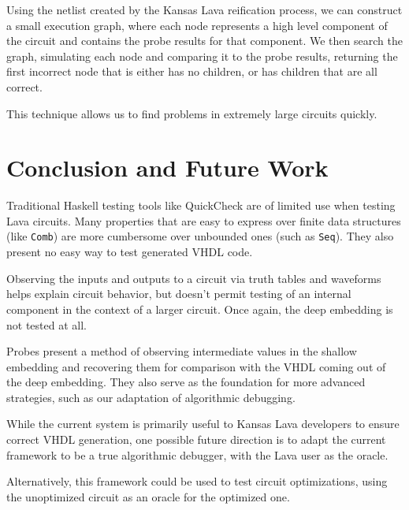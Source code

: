 \documentclass{llncs}
\begin{document}

Using the netlist created by the Kansas Lava reification process, we can construct
a small execution graph, where each node represents a high level component of
the circuit and contains the probe results for that component. We then search the
graph, simulating each node and comparing it to the probe results, returning
the first incorrect node that is either has no children, or has children that
are all correct.


This technique allows us to find problems in extremely large circuits quickly.


\section{Conclusion and Future Work}

Traditional Haskell testing tools like QuickCheck are of limited use
when testing Lava circuits. Many properties that are easy to express
over finite data structures (like \verb!Comb!) are more cumbersome
over unbounded ones (such as \verb!Seq!). They also present no easy
way to test generated VHDL code.

Observing the inputs and outputs to a circuit via truth tables and
waveforms helps explain circuit behavior, but doesn't permit testing
of an internal component in the context of a larger circuit. Once again,
the deep embedding is not tested at all.

Probes present a method of observing intermediate values in the shallow
embedding and recovering them for comparison with the VHDL coming out of
the deep embedding. They also serve as the foundation for more advanced 
strategies, such as our adaptation of algorithmic debugging.

While the current system is primarily useful to Kansas Lava developers to
ensure correct VHDL generation, one possible future direction is to adapt 
the current framework to be a true algorithmic debugger, with the Lava
user as the oracle.

Alternatively, this framework could be used to test circuit optimizations,
using the unoptimized circuit as an oracle for the optimized one.
\end{document}
